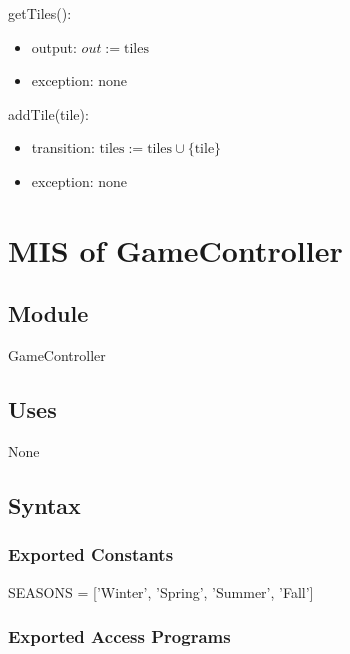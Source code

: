 \documentclass[12pt, titlepage]{article}
\begin{document}
\noindent getTiles():
\begin{itemize}
\item output: $out := \text{tiles}$
\item exception: none
\end{itemize}

\noindent addTile(tile):
\begin{itemize}
\item transition: $\text{tiles} := \text{tiles} \cup \{\text{tile}\}$
\item exception: none
\end{itemize}

  
\medskip
\newpage

\section{MIS of GameController} \label{ServerAuth} 

\subsection{Module}

GameController

\subsection{Uses}

None

\subsection{Syntax}

\subsubsection{Exported Constants}

SEASONS = ['Winter', 'Spring', 'Summer', 'Fall']

\subsubsection{Exported Access Programs}
\end{document}
